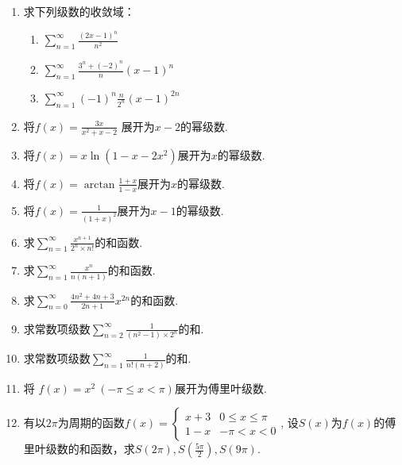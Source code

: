 \begin{enumerate}
\begin{enumerate}
		
		\item $\sum\limits_{n=1}^{\infty} \frac{(-1)^n}{n-\ln n}$

	\end{enumerate}
	
	\item 求下列级数的收敛域：
	\begin{enumerate}
		\item $\sum\limits_{n=1}^{\infty} \frac{(2x-1)^n}{n^2}$

		\item $\sum\limits_{n=1}^{\infty} \frac{3^n+(-2)^n}{n} (x-1)^n$

		\item $\sum\limits_{n=1}^{\infty} (-1)^n \frac{n}{2^n} (x-1)^{2n}$
	
	\end{enumerate}
	
	
	\item 将$f(x)=\frac{3x}{x^2+x-2}$ 展开为$x-2$的幂级数.

	
	\item 将$f(x)=x\ln(1-x-2x^2)$展开为$x$的幂级数.

	
	\item 将$f(x)=\arctan \frac{1+x}{1-x}$展开为$x$的幂级数.
		
	\item 将$f(x)=\frac{1}{(1+x)^2}$展开为$x-1$的幂级数.


	\item 求$\sum\limits_{n=1}^{\infty} \frac{x^{n+1}}{2^n \times n!}$的和函数.


	
	\item 求$\sum\limits_{n=1}^{\infty} \frac{x^n}{n(n+1)}$的和函数.
	
	\item 求$\sum\limits_{n=0}^{\infty} \frac{4n^2+4n+3}{2n+1} x^{2n}$的和函数.

	\item 求常数项级数$\sum\limits_{n=2}^{\infty} \frac{1}{(n^2-1) \times 2^n}$的和.

	\item 求常数项级数$\sum\limits_{n=1}^{\infty} \frac{1}{n! (n+2)}$的和.

	\item 将 $f(x)=x^2 \ (-\pi \le x < \pi)$展开为傅里叶级数.

	\item 有以$2\pi$为周期的函数$f(x)= \begin{cases} x+3 & 0 \le x \le \pi \\ 1-x & -\pi < x < 0 \end{cases}$, 设$S(x)$为$f(x)$的傅里叶级数的和函数，求$S(2\pi), S(\frac{5\pi}{2}), S(9\pi)$.


	
\end{enumerate}

